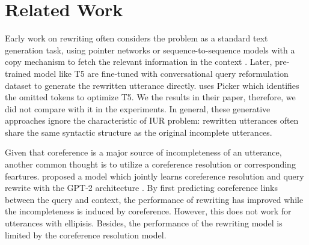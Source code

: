 \section{Related Work}
Early work on rewriting often considers the problem as a 
standard text generation task,
using pointer networks 
or sequence-to-sequence models %
with a copy mechanism 
\citep{su-etal-2019-improving,elgohary-etal-2019-unpack,quan-etal-2019-gecor}
to fetch the relevant information in the context \citep{gu-etal-2016-incorporating}.
Later, pre-trained model like T5 \citep{2020t5} are fine-tuned with conversational 
query reformulation dataset to generate the rewritten utterance directly. \citet{DBLP:journals/corr/abs-2204-03958} uses Picker which identifies the omitted tokens to optimize T5. We the results in their paper, 
therefore, we did not compare with it in the experiments. In general, these generative approaches ignore the characteristic of IUR problem: rewritten utterances often share the same syntactic structure as the original incomplete utterances.

Given that coreference is a major 
source of incompleteness of an utterance,
another common thought is to utilize a 
coreference resolution or corresponding 
feartures. 
\citet{tseng-etal-2021-cread} 
proposed a model which jointly learns coreference resolution
and query rewrite 
with the GPT-2 architecture \citep{Radford2019LanguageMA}.
By first predicting coreference links
between the query and context,
the performance of rewriting has improved 
while the incompleteness is induced
by coreference.
However, this does not work for utterances
with ellipisis. Besides, the performance of 
the rewriting
 model is limited by
the coreference resolution model.

